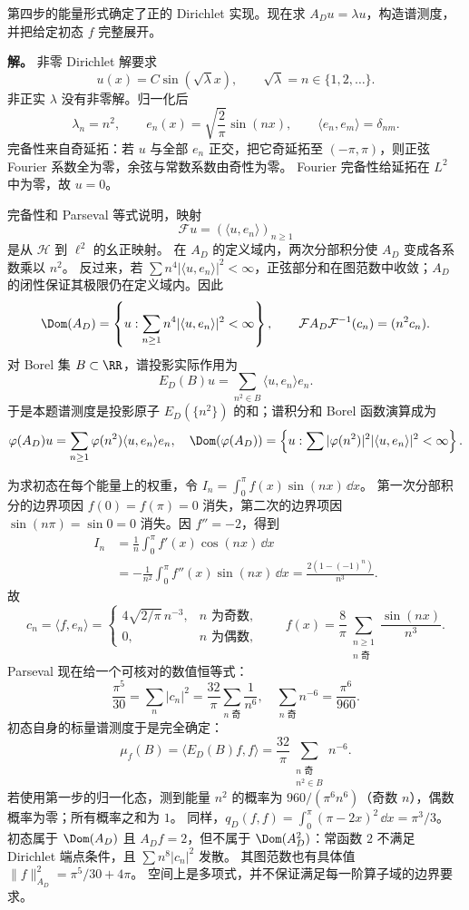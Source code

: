 \begin{exbox}
第四步的能量形式确定了正的 Dirichlet 实现。现在求 $A_Du=\lambda u$，构造谱测度，并把给定初态 $f$ 完整展开。

\textbf{解。} 非零 Dirichlet 解要求
\[
 u(x)=C\sin(\sqrt\lambda x),\qquad
 \sqrt\lambda=n\in\{1,2,\ldots\}.
\]
非正实 $\lambda$ 没有非零解。归一化后
\[
 \lambda_n=n^2,\qquad e_n(x)=\sqrt{\frac2\pi}\sin(nx),\qquad
 \langle e_n,e_m\rangle=\delta_{nm}.
\]
完备性来自奇延拓：若 $u$ 与全部 $e_n$ 正交，把它奇延拓至 $(-\pi,\pi)$，则正弦 Fourier 系数全为零，余弦与常数系数由奇性为零。
Fourier 完备性给延拓在 $L^2$ 中为零，故 $u=0$。

完备性和 Parseval 等式说明，映射
\[
 \mathcal Fu=(\langle u,e_n\rangle)_{n\ge1}
\]
是从 $\mathcal H$ 到 $\ell^2$ 的幺正映射。
在 $A_D$ 的定义域内，两次分部积分使 $A_D$ 变成各系数乘以 $n^2$。
反过来，若 $\sum n^4|\langle u,e_n\rangle|^2<\infty$，正弦部分和在图范数中收敛；$A_D$ 的闭性保证其极限仍在定义域内。因此
\[
 \Dom(A_D)=\left\{u:\sum_{n\ge1}n^4|\langle u,e_n\rangle|^2<\infty\right\},
 \qquad \mathcal F A_D\mathcal F^{-1}(c_n)=(n^2c_n).
\]
对 Borel 集 $B\subset\RR$，谱投影实际作用为
\[
 E_D(B)u=\sum_{n^2\in B}\langle u,e_n\rangle e_n.
\]
于是本题谱测度是投影原子 $E_D(\{n^2\})$ 的和；谱积分和 Borel 函数演算成为
\[
 \varphi(A_D)u=\sum_{n\ge1}\varphi(n^2)\langle u,e_n\rangle e_n,
 \quad
 \Dom(\varphi(A_D))=\left\{u:\sum|\varphi(n^2)|^2|\langle u,e_n\rangle|^2<\infty\right\}.
\]

为求初态在每个能量上的权重，令 $I_n=\int_0^\pi f(x)\sin(nx)\,\dd x$。
第一次分部积分的边界项因 $f(0)=f(\pi)=0$ 消失，第二次的边界项因 $\sin(n\pi)=\sin0=0$ 消失。因 $f''=-2$，得到
\begin{align*}
 I_n&=\frac1n\int_0^\pi f'(x)\cos(nx)\,\dd x\\
 &=-\frac1{n^2}\int_0^\pi f''(x)\sin(nx)\,\dd x
 =\frac{2(1-(-1)^n)}{n^3}.
\end{align*}
故
\[
 c_n=\langle f,e_n\rangle
 =\begin{cases}4\sqrt{2/\pi}\,n^{-3},&n\text{ 为奇数},\\0,&n\text{ 为偶数},\end{cases}
 \qquad
 f(x)=\frac8\pi\sum_{\substack{n\ge1\\n\text{ 奇}}}\frac{\sin(nx)}{n^3}.
\]
Parseval 现在给一个可核对的数值恒等式：
\[
 \frac{\pi^5}{30}=\sum_n|c_n|^2
 =\frac{32}\pi\sum_{n\text{ 奇}}\frac1{n^6},
 \quad \sum_{n\text{ 奇}}n^{-6}=\frac{\pi^6}{960}.
\]
初态自身的标量谱测度于是完全确定：
\[
 \mu_f(B)=\langle E_D(B)f,f\rangle
 =\frac{32}\pi\sum_{\substack{n\text{ 奇}\\n^2\in B}}n^{-6}.
\]
若使用第一步的归一化态，测到能量 $n^2$ 的概率为 $960/(\pi^6n^6)$（奇数 $n$），偶数概率为零；所有概率之和为 $1$。
同样，$q_D(f,f)=\int_0^\pi(\pi-2x)^2\,\dd x=\pi^3/3$。
初态属于 $\Dom(A_D)$ 且 $A_Df=2$，但不属于 $\Dom(A_D^2)$：常函数 $2$ 不满足 Dirichlet 端点条件，且 $\sum n^8|c_n|^2$ 发散。
其图范数也有具体值 $\|f\|_{A_D}^2=\pi^5/30+4\pi$。
空间上是多项式，并不保证满足每一阶算子域的边界要求。
\end{exbox}

